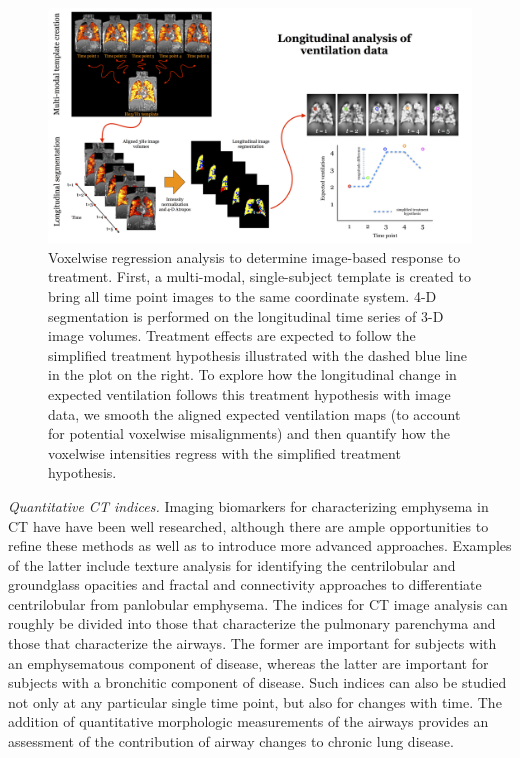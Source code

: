 \documentclass[11pt,]{article}
\begin{document}
\begin{figure}[htbp]
\centering
\includegraphics{Figs/longitudinalStudy.png}
\caption{Voxelwise regression analysis to determine image-based response
to treatment. First, a multi-modal, single-subject template is created
to bring all time point images to the same coordinate system. 4-D
segmentation is performed on the longitudinal time series of 3-D image
volumes. Treatment effects are expected to follow the simplified
treatment hypothesis illustrated with the dashed blue line in the plot
on the right. To explore how the longitudinal change in expected
ventilation follows this treatment hypothesis with image data, we smooth
the aligned expected ventilation maps (to account for potential
voxelwise misalignments) and then quantify how the voxelwise intensities
regress with the simplified treatment hypothesis.}
\end{figure}

\emph{Quantitative CT indices.} Imaging biomarkers for characterizing
emphysema in CT have have been well researched, although there are ample
opportunities to refine these methods as well as to introduce more
advanced approaches. Examples of the latter include texture analysis for
identifying the centrilobular and groundglass opacities and fractal and
connectivity approaches to differentiate centrilobular from panlobular
emphysema. The indices for CT image analysis can roughly be divided into
those that characterize the pulmonary parenchyma and those that
characterize the airways. The former are important for subjects with an
emphysematous component of disease, whereas the latter are important for
subjects with a bronchitic component of disease. Such indices can also
be studied not only at any particular single time point, but also for
changes with time. The addition of quantitative morphologic measurements
of the airways provides an assessment of the contribution of airway
changes to chronic lung disease.
\end{document}
